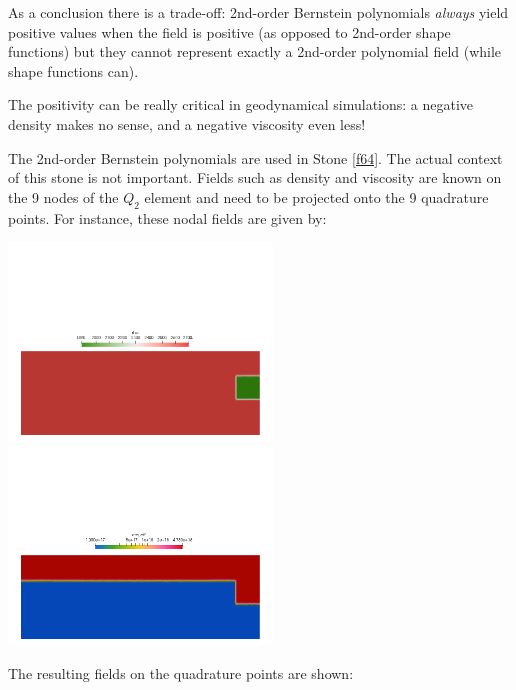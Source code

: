 As a conclusion there is a trade-off: 2nd-order Bernstein polynomials {\it always} yield positive 
values when the field is positive (as opposed to 2nd-order shape functions) but they cannot 
represent exactly a 2nd-order polynomial field (while shape functions can).

The positivity can be really critical in geodynamical simulations: a negative density makes no sense, 
and a negative viscosity even less!

The 2nd-order Bernstein polynomials are used in Stone \ref{f64}. The actual context of this stone is not 
important. Fields such as density and viscosity are known on the 
9 nodes of the $Q_2$ element and need to be projected onto the 9 quadrature points. 
For instance, these nodal fields are given by:
\begin{center}
\includegraphics[width=7cm]{images/bernstein/rhonodal.png}
\includegraphics[width=7cm]{images/bernstein/etaeffnodal.png}
\end{center}
The resulting fields on the quadrature points are shown:
